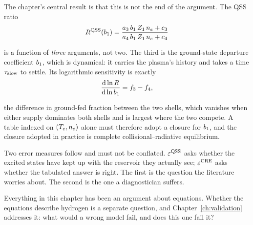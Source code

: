 The chapter's central result is that this is not the end of the argument. The
QSS ratio
\begin{equation*}
  R^{\mathrm{QSS}}(b_1) = \frac{a_3\,b_1\,Z_{1}\,n_e + c_3}
                      {a_4\,b_1\,Z_{1}\,n_e + c_4}
\end{equation*}

\noindent is a function of \emph{three} arguments, not two. The third is the
ground-state departure coefficient $b_1$, which is dynamical: it carries the
plasma's history and takes a time $\tau_{\mathrm{slow}}$ to settle. Its logarithmic
sensitivity is exactly
\begin{equation*}
  \frac{\mathrm{d}\ln R}{\mathrm{d}\ln b_1} = f_{3} - f_{4},
\end{equation*}

\noindent the difference in ground-fed fraction between the two shells, which
vanishes when either supply dominates both shells and is largest where the two
compete. A table indexed on $(T_e,n_e)$ alone must therefore adopt a closure for
$b_1$, and the closure adopted in practice is complete collisional--radiative
equilibrium.

Two error measures follow and must not be conflated. $\varepsilon^{\mathrm{QSS}}$ asks whether the
excited states have kept up with the reservoir they actually see; $\varepsilon^{\mathrm{CRE}}$ asks
whether the tabulated answer is right. The first is the question the literature
worries about. The second is the one a diagnostician suffers.

Everything in this chapter has been an argument about equations. Whether the
equations describe hydrogen is a separate question, and Chapter~\ref{ch:validation}
addresses it: what would a wrong model fail, and does this one fail it?
